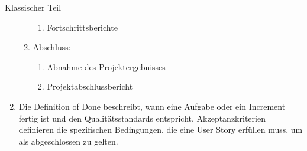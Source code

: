 \documentclass{article}
\begin{document}
\begin{exercise}{Klassischer Teil}
\begin{solution}
\begin{enumerate}
\begin{enumerate}
\begin{enumerate}
                      \item Fortschrittsberichte
                    \end{enumerate}
              \item Abschluss:
                    \begin{enumerate}
                      \item Abnahme des Projektergebnisses
                      \item Projektabschlussbericht
                    \end{enumerate}
            \end{enumerate}
      \item Die Definition of Done beschreibt, wann eine Aufgabe oder ein Increment fertig ist und den Qualitätsstandards entspricht. Akzeptanzkriterien definieren die spezifischen Bedingungen, die eine User Story erfüllen muss, um als abgeschlossen zu gelten.
    \end{enumerate}
  \end{solution}
\end{exercise}
\end{document}
